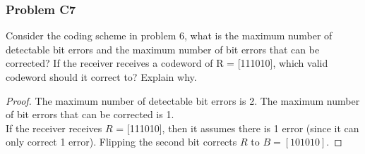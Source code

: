 \documentclass[../../../main.tex]{subfiles}
\begin{document}
\subsubsection{Problem C7}
\begin{wts}
    Consider the coding scheme in problem 6, what is the maximum number of detectable bit errors and the maximum number of bit errors that can be corrected? If the receiver receives a codeword of R = [111010], which valid codeword should it correct to? Explain why.
\end{wts}
\begin{proof}
The maximum number of detectable bit errors is 2. The maximum number of bit errors that can be corrected is 1.\\

If the receiver receives $R$ = [111010], then it assumes there is 1 error (since it can only correct 1 error). Flipping the second bit corrects $R$ to $B=[101010]$.
\end{proof}
\end{document}
